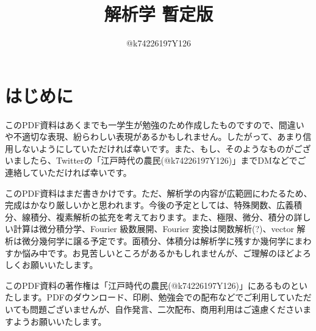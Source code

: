 \documentclass[10pt,a4paper,titlepage]{jsarticle}
\title{解析学 暫定版}
\author{@k74226197Y126}
\begin{document}
\maketitle
{}
\section*{はじめに}
このPDF資料はあくまでも一学生が勉強のため作成したものですので、間違いや不適切な表現、紛らわしい表現があるかもしれません。したがって、あまり信用しないようにしていただければ幸いです。また、もし、そのようなものがございましたら、Twitterの「江戸時代の農民(@k74226197Y126)」までDMなどでご連絡していただければ幸いです。\par
このPDF資料はまだ書きかけです。ただ、解析学の内容が広範囲にわたるため、完成はかなり厳しいかと思われます。今後の予定としては、特殊関数、広義積分、線積分、複素解析の拡充を考えております。また、極限、微分、積分の詳しい計算は微分積分学、Fourier 級数展開、Fourier 変換は関数解析(?)、vector 解析は微分幾何学に譲る予定です。面積分、体積分は解析学に残すか幾何学にまわすか悩み中です。お見苦しいところがあるかもしれませんが、ご理解のほどよろしくお願いいたします。\par
このPDF資料の著作権は「江戸時代の農民(@k74226197Y126)」にあるものといたします。PDFのダウンロード、印刷、勉強会での配布などでご利用していただいても問題ございませんが、自作発言、二次配布、商用利用はご遠慮くださいますようお願いいたします。
\tableofcontents
\clearpage
{}


\clearpage

\clearpage

\clearpage

\clearpage

\clearpage

\clearpage

\clearpage

\clearpage

\clearpage


\clearpage

\clearpage

\clearpage

\clearpage


\clearpage

\clearpage

\clearpage

\clearpage

\clearpage

\clearpage

\clearpage

\clearpage


\clearpage

\clearpage

\clearpage

\clearpage


\clearpage


\clearpage

\clearpage

\clearpage


\clearpage

\clearpage

\clearpage

\clearpage

\clearpage

\clearpage

\clearpage


\clearpage

\clearpage

\clearpage

\clearpage

\clearpage

%
%
%
\end{document}
